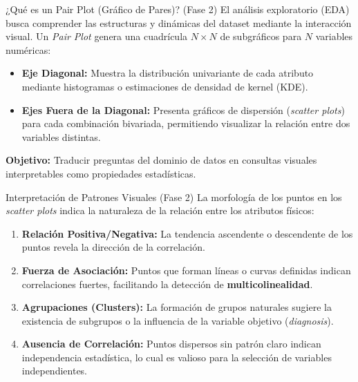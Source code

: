 \documentclass{beamer}
\begin{document}
	\begin{frame}{¿Qué es un Pair Plot (Gráfico de Pares)? (Fase 2)}
		El análisis exploratorio (EDA) busca comprender las estructuras y dinámicas del dataset mediante la interacción visual. Un \textit{Pair Plot} genera una cuadrícula $N \times N$ de subgráficos para $N$ variables numéricas:
		
		\begin{itemize}
			\item<2-> \textbf{Eje Diagonal:} Muestra la distribución univariante de cada atributo mediante histogramas o estimaciones de densidad de kernel (KDE).
			\item<3-> \textbf{Ejes Fuera de la Diagonal:} Presenta gráficos de dispersión (\textit{scatter plots}) para cada combinación bivariada, permitiendo visualizar la relación entre dos variables distintas.
		\end{itemize}
		\textbf{Objetivo:} Traducir preguntas del dominio de datos en consultas visuales interpretables como propiedades estadísticas.
	\end{frame}
	
	\begin{frame}{Interpretación de Patrones Visuales (Fase 2)}
		La morfología de los puntos en los \textit{scatter plots} indica la naturaleza de la relación entre los atributos físicos:
		
		\begin{enumerate}
			\item<2-> \textbf{Relación Positiva/Negativa:} La tendencia ascendente o descendente de los puntos revela la dirección de la correlación.
			\item<3-> \textbf{Fuerza de Asociación:} Puntos que forman líneas o curvas definidas indican correlaciones fuertes, facilitando la detección de \textbf{multicolinealidad}.
			\item<4-> \textbf{Agrupaciones (Clusters):} La formación de grupos naturales sugiere la existencia de subgrupos o la influencia de la variable objetivo (\textit{diagnosis}).
			\item<5-> \textbf{Ausencia de Correlación:} Puntos dispersos sin patrón claro indican independencia estadística, lo cual es valioso para la selección de variables independientes.
		\end{enumerate}
	\end{frame}
	
\end{document}
